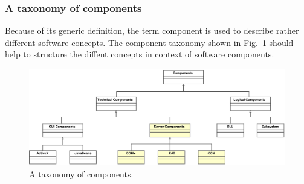\subsubsection{A taxonomy of components}

Because of its generic definition, the term component is used to describe
rather different software concepts.
The component taxonomy shown in Fig.~\ref{ComponentTaxonomy} should 
help to structure the diffent concepts in context of software components.

\begin{figure}[htbp]
    \begin{center}
        \includegraphics [width=15cm,angle=0] {uml/ComponentTaxonomy.eps}
        \caption{A taxonomy of components.}
        \label{ComponentTaxonomy}
    \end{center}
\end{figure}

